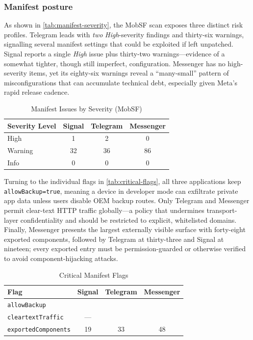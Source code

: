 \documentclass[a4paper,12pt]{report}
\newcommand{\cmark}{\ding{51}} %
\begin{document}
\subsubsection{Manifest posture}
As shown in \autoref{tab:manifest-severity}, the MobSF scan exposes three distinct risk profiles.
Telegram leads with \emph{two} \emph{High}-severity findings and thirty-six warnings, signalling several manifest settings that could be exploited if left unpatched.
Signal reports a single \emph{High} issue plus thirty-two warnings—evidence of a somewhat tighter, though still imperfect, configuration.
Messenger has no high-severity items, yet its eighty-six warnings reveal a “many-small” pattern of misconfigurations that can accumulate technical debt, especially given Meta’s rapid release cadence.

\begin{table}[htbp]
  \centering
  \caption{Manifest Issues by Severity (MobSF)}
  \label{tab:manifest-severity}
  \begin{tabular}{|l|c|c|c|}
    \hline
    \textbf{Severity Level} & \textbf{Signal} & \textbf{Telegram} & \textbf{Messenger} \\ \hline
    High      & 1  & 2  & 0  \\ \hline
    Warning   & 32 & 36 & 86 \\ \hline
    Info      & 0  & 0  & 0  \\ \hline
  \end{tabular}
\end{table}

Turning to the individual flags in \autoref{tab:critical-flags}, all three applications keep \\
 \texttt{allowBackup=true}, meaning a device in developer mode can exfiltrate private app data unless users disable OEM backup routes. Only Telegram and Messenger permit clear-text HTTP traffic globally—a policy that undermines transport-layer confidentiality and should be restricted to explicit, whitelisted domains. Finally, Messenger presents the largest externally visible surface with forty-eight exported components, followed by Telegram at thirty-three and Signal at nineteen; every exported entry must be permission-guarded or otherwise verified to avoid component-hijacking attacks.
\begin{table}[htbp]
  \centering
  \caption{Critical Manifest Flags}
  \label{tab:critical-flags}
  \begin{tabular}{|l|c|c|c|}
    \hline
    \textbf{Flag} & \textbf{Signal} & \textbf{Telegram} & \textbf{Messenger} \\ \hline
    \texttt{allowBackup}        & \cmark & \cmark & \cmark \\ \hline
    \texttt{cleartextTraffic}   & —      & \cmark & \cmark \\ \hline
    \texttt{exportedComponents} & 19     & 33     & 48     \\ \hline
  \end{tabular}
\end{table}
\end{document}
